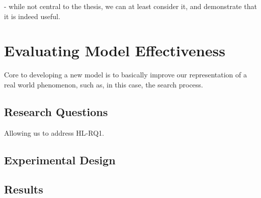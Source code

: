 - while not central to the thesis, we can at least consider it, and demonstrate that it is indeed useful.


\section{Evaluating Model Effectiveness}
Core to developing a new model is to basically improve our representation of a real world phenomenon, such as, in this case, the search process.

\subsection{Research Questions}
Allowing us to address HL-RQ1.

\subsection{Experimental Design}

\subsection{Results}

